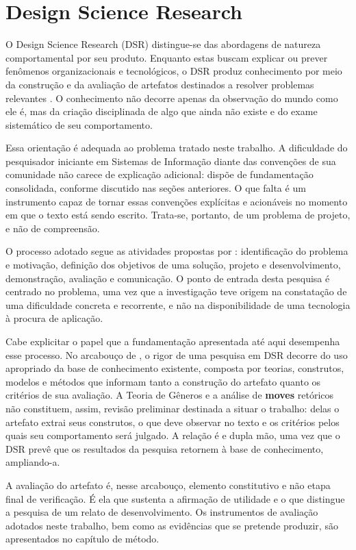 \section{Design Science Research}

O Design Science Research (DSR) distingue-se das abordagens de natureza comportamental por seu produto. Enquanto estas buscam explicar ou prever fenômenos organizacionais e tecnológicos, o DSR produz conhecimento por meio da construção e da avaliação de artefatos destinados a resolver problemas relevantes \cite{Hevner2004}. O conhecimento não decorre apenas da observação do mundo como ele é, mas da criação disciplinada de algo que ainda não existe e do exame sistemático de seu comportamento.

Essa orientação é adequada ao problema tratado neste trabalho. A dificuldade do pesquisador iniciante em Sistemas de Informação diante das convenções de sua comunidade não carece de explicação adicional: dispõe de fundamentação consolidada, conforme discutido nas seções anteriores. O que falta é um instrumento capaz de tornar essas convenções explícitas e acionáveis no momento em que o texto está sendo escrito. Trata-se, portanto, de um problema de projeto, e não de compreensão.

O processo adotado segue as atividades propostas por \cite{Peffers2007}: identificação do problema e motivação, definição dos objetivos de uma solução, projeto e desenvolvimento, demonstração, avaliação e comunicação. O ponto de entrada desta pesquisa é centrado no problema, uma vez que a investigação teve origem na constatação de uma dificuldade concreta e recorrente, e não na disponibilidade de uma tecnologia à procura de aplicação.

Cabe explicitar o papel que a fundamentação apresentada até aqui desempenha esse processo. No arcabouço de \cite{Hevner2004}, o rigor de uma pesquisa em DSR decorre do uso apropriado da base de conhecimento existente, composta por teorias, construtos, modelos e métodos que informam tanto a construção do artefato quanto os critérios de sua avaliação. A Teoria de Gêneros e a análise de \textbf{moves} retóricos não constituem, assim, revisão preliminar destinada a situar o trabalho: delas o artefato extrai seus construtos, o que deve observar no texto e os critérios pelos quais seu comportamento será julgado. A relação é e dupla mão, uma vez que o DSR prevê que os resultados da pesquisa retornem à base de conhecimento, ampliando-a.

A avaliação do artefato é, nesse arcabouço, elemento constitutivo e não etapa final de verificação. É ela que sustenta a afirmação de utilidade e o que distingue a pesquisa de um relato de desenvolvimento. Os instrumentos de avaliação adotados neste trabalho, bem como as evidências que se pretende produzir, são apresentados no capítulo de método.




